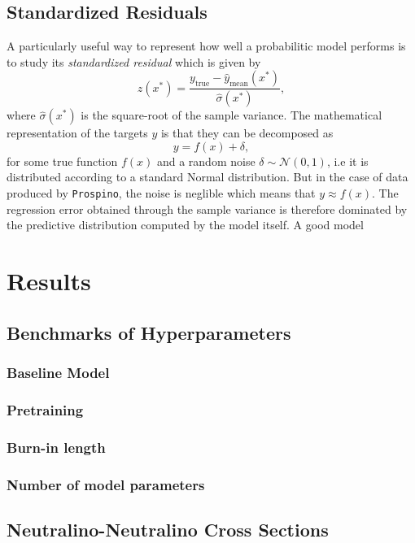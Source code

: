 \subsection{Standardized Residuals}
A particularly useful way to represent how well a probabilitic model performs is to study its \textit{standardized residual} which is given by
\begin{equation}
    z(x^*) = \frac{y_\text{true} - \hat{y}_\text{mean}(x^*)}{\hat{\sigma}(x^*)},
\end{equation}
where $\hat{\sigma}(x^*)$ is the square-root of the sample variance. The mathematical representation of the targets $y$ is that they can be decomposed as
\begin{equation}
    y = f(x) + \delta,
\end{equation}
for some true function $f(x)$ and a random noise $\delta \sim \mathcal{N}(0, 1)$, i.e it is distributed according to a standard Normal distribution. But in the case of data produced by \texttt{Prospino}, the noise is neglible which means that $y \approx f(x)$. The regression error obtained through the sample variance is therefore dominated by the predictive distribution computed by the model itself. A good model 



\section{Results}\label{sec:results}
\subsection{Benchmarks of Hyperparameters}\label{subsec:benchmarks}
\subsubsection{Baseline Model}
\subsubsection{Pretraining}
\subsubsection{Burn-in length}
\subsubsection{Number of model parameters}

\subsection{Neutralino-Neutralino Cross Sections}\label{subsec:neuralino_experiments}

